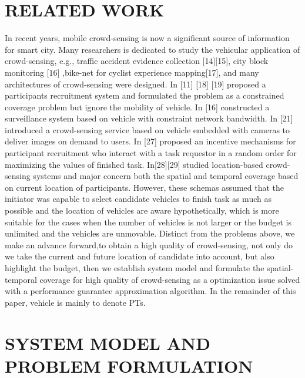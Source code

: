 \documentclass[journal]{IEEEtran}
\begin{document}
\section{RELATED WORK}
In recent years, mobile crowd-sensing is now a significant source of information for smart city. Many researchers is dedicated to study the vehicular application of crowd-sensing, e.g., traffic accident evidence collection [14][15], city block monitoring [16] ,bike-net for cyclist experience mapping[17], and many architectures of crowd-sensing were designed. In [11] [18] [19] proposed a participants recruitment system and formulated the problem as a constrained coverage problem but ignore the mobility of vehicle. In [16] constructed a surveillance system based on vehicle with constraint network bandwidth. In [21] introduced a crowd-sensing service based on vehicle embedded with cameras to deliver images on demand to users. In [27] proposed an incentive mechanisms for participant recruitment who interact with a task requestor in a random order for maximizing the values of finished task. In[28][29] studied location-based crowd-sensing systems and major concern both the spatial and temporal coverage based on current location of participants. However,  these schemas assumed that the initiator was capable to select candidate vehicles to finish task as much as possible and the location of vehicles are aware hypothetically, which is more suitable for the cases when the number of vehicles is not larger or the budget is unlimited and the vehicles are unmovable. Distinct from the problems above, we make an advance forward,to obtain a high quality of crowd-sensing, not only do we take the current and future location of candidate into account, but also highlight the budget, then we establish system model and formulate the spatial-temporal coverage for high quality of crowd-sensing as a optimization issue solved with a performance guarantee approximation algorithm. In the remainder of this paper, vehicle is mainly to denote PTs.
\section{SYSTEM MODEL AND PROBLEM FORMULATION}
\end{document}
